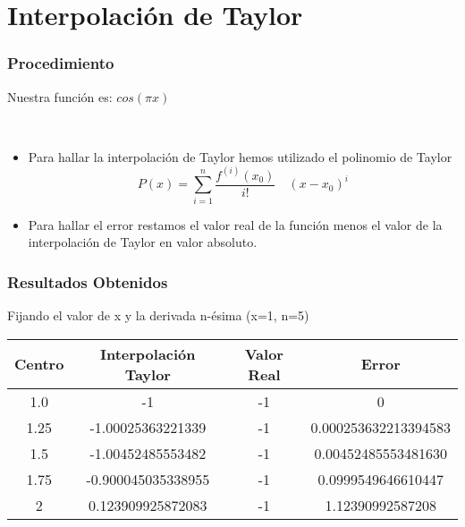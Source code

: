 \documentclass{beamer}
\begin{document}
\section{Interpolación de Taylor}
\begin{frame}
	\frametitle{Procedimiento}
		\centerline {Nuestra función es: {\LARGE $cos(\pi x)$ }}\
        \begin{itemize}
        \item Para hallar la interpolación de Taylor hemos utilizado el polinomio de Taylor
        \[P(x)=\sum\limits_{i=1}^n\frac{f^{(i)}(x_0)}{i!}\quad(x-x_0)^i \]
		\item Para hallar el error restamos el valor real de la función menos el valor de la interpolación de Taylor en valor absoluto.
		\end{itemize}
\end{frame}
\begin{frame}
  \frametitle{Resultados Obtenidos}
	Fijando el valor de x y la derivada n-ésima (x=1, n=5)\\
	\begin{center}
	\begin{tabular}{||c|c|c|c||}
	\hline
    \hline
	Centro & Interpolación Taylor & Valor Real & Error \\
	\hline
	1.0 & -1 & -1 & 0\\
	\hline
	1.25 & -1.00025363221339 & -1 & 0.000253632213394583 \\
	\hline
	1.5 & -1.00452485553482 & -1 & 0.00452485553481630\\	
	\hline
	1.75 & -0.900045035338955 & -1 & 0.0999549646610447\\
	\hline
	2 & 0.123909925872083 & -1 & 1.12390992587208\\
	\hline
    \hline
	\end{tabular}
    \end{center}
\end{frame}
\end{document}
